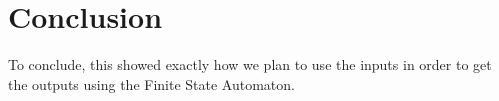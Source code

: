 \section{Conclusion}

To conclude, this showed exactly how we plan to use the inputs in order to get the outputs using the Finite State Automaton.